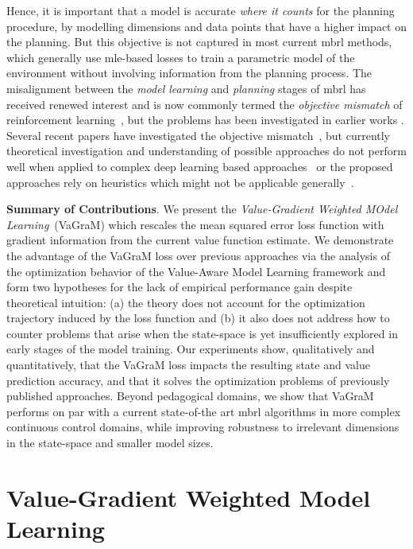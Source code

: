 Hence, it is important that a model is accurate \textit{where it counts} for the planning procedure, by modelling dimensions and data points that have a higher impact on the planning.
But this objective is not captured in most current \ac{mbrl} methods, which generally use \ac{mle}-based losses to train a parametric model of the environment without involving information from the planning process.
The misalignment between the \emph{model learning} and \emph{planning} stages of \ac{mbrl} has received renewed interest and is now commonly termed the \textit{objective mismatch} of reinforcement learning~\parencite{lambert202objective}, but the problems has been investigated in earlier works \parencite{joseph2013reinforcement}.
Several recent papers have investigated the objective mismatch~\parencite{abachi2020policy,zhang2021learning,ayoub2020model,grimm2020value,grimm2021proper,nikishin2021control}, but currently theoretical investigation and understanding of possible approaches do not perform well when applied to complex deep learning based approaches~\parencite{lovatto2020decision} or the proposed approaches rely on heuristics which might not be applicable generally~\parencite{nair2020goal}.

\noindent \textbf{Summary of Contributions}. We present the \textit{Value-Gradient Weighted MOdel Learning}~(VaGraM) which rescales the mean squared error loss function with gradient information from the current value function estimate.
We demonstrate the advantage of the VaGraM loss over previous approaches via the analysis of the optimization behavior of the Value-Aware Model Learning framework \parencite{vaml, itervaml} and form two hypotheses for the lack of empirical performance gain despite theoretical intuition: (a) the theory does not account for the optimization trajectory induced by the loss function and (b) it also does not address how to counter problems that arise when the state-space is yet insufficiently explored in early stages of the model training.
Our experiments show, qualitatively and quantitatively, that the VaGraM loss impacts the resulting state and value prediction accuracy, and that it solves the optimization problems of previously published approaches.
Beyond pedagogical domains, we show that VaGraM performs on par with a current state-of-the art \ac{mbrl} algorithms in more complex continuous control domains, while improving robustness to irrelevant dimensions in the state-space and smaller model sizes.



\section{Value-Gradient Weighted Model Learning}
\label{sec:vagram:method}

